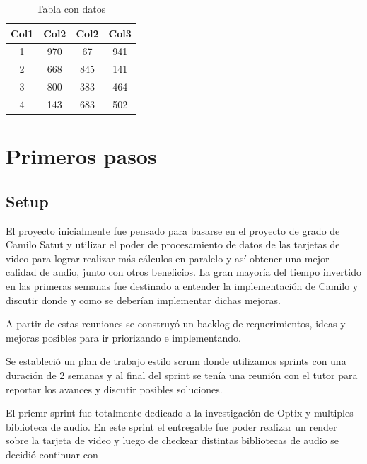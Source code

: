 \documentclass{prgrado}
\begin{document}
\begin{table}[h!]
\centering
\begin{tabular}{| c | c | c | c |} 
 \hline
 Col1 & Col2 & Col2 & Col3 \\  
 \hline
 1 & 970 & 67 & 941 \\ 
 2 & 668 & 845 & 141 \\
 3 & 800 & 383 & 464 \\
 4 & 143 & 683 & 502 \\
 \hline
\end{tabular}
\caption{Tabla con datos}
\label{table:datos}
\end{table}


\chapter{Primeros pasos}

\section{Setup}

El proyecto inicialmente fue pensado para basarse en el proyecto de grado de Camilo Satut y utilizar el poder de procesamiento de datos de las tarjetas de video para lograr realizar más cálculos en paralelo y así obtener una mejor calidad de audio, junto con otros beneficios. La gran mayoría del tiempo invertido en las primeras semanas fue destinado a entender la implementación de Camilo y discutir donde y como se deberían implementar dichas mejoras.

A partir de estas reuniones se construyó un backlog de requerimientos, ideas y mejoras posibles para ir priorizando e implementando. 

Se estableció un plan de trabajo estilo scrum donde utilizamos sprints con una duración de 2 semanas y al final del sprint se tenía una reunión con el tutor para reportar los avances y discutir posibles soluciones. 

El priemr sprint fue totalmente dedicado a la investigación de Optix y multiples biblioteca de audio. En este sprint el entregable fue poder realizar un render sobre la tarjeta de video y luego de checkear distintas bibliotecas de audio se decidió continuar con 



\end{document}
